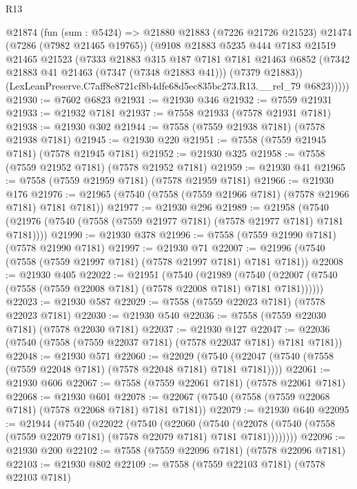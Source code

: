 \begin{lexlean}{R13}
\begin{coremodule}
      @21874
        (fun (sum : @5424) =>
        @21880
          @21883
          (@7226 @21726 @21523)
          @21474
          (@7286 (@7982 @21465 @19765))
          (@9108
            @21883
            @5235
            @444
            @7183
            @21519
            @21465
            @21523
            (@7333
              @21883
              @315
              @187
              @7181
              @7181
              @21463
              @6852
              (@7342 @21883 @41 @21463 (@7347 (@7348 @21883 @41)))
              (@7379 @21883))
            (LexLeanPreserve.C7aff8e8721cf8b4dfe68d5ec835bc273.R13.__rel_79 @6823)))))
@21930 := @7602 @6823
@21931 := @21930 @346
@21932 := @7559 @21931
@21933 := @21932 @7181
@21937 := @7558 @21933 (@7578 @21931 @7181)
@21938 := @21930 @302
@21944 := @7558 (@7559 @21938 @7181) (@7578 @21938 @7181)
@21945 := @21930 @220
@21951 := @7558 (@7559 @21945 @7181) (@7578 @21945 @7181)
@21952 := @21930 @325
@21958 := @7558 (@7559 @21952 @7181) (@7578 @21952 @7181)
@21959 := @21930 @41
@21965 := @7558 (@7559 @21959 @7181) (@7578 @21959 @7181)
@21966 := @21930 @176
@21976 := @21965 (@7540 (@7558 (@7559 @21966 @7181) (@7578 @21966 @7181) @7181 @7181))
@21977 := @21930 @296
@21989 := @21958
    (@7540 (@21976 (@7540 (@7558 (@7559 @21977 @7181) (@7578 @21977 @7181) @7181 @7181))))
@21990 := @21930 @378
@21996 := @7558 (@7559 @21990 @7181) (@7578 @21990 @7181)
@21997 := @21930 @71
@22007 := @21996 (@7540 (@7558 (@7559 @21997 @7181) (@7578 @21997 @7181) @7181 @7181))
@22008 := @21930 @405
@22022 := @21951
    (@7540
      (@21989
        (@7540 (@22007 (@7540 (@7558 (@7559 @22008 @7181) (@7578 @22008 @7181) @7181 @7181))))))
@22023 := @21930 @587
@22029 := @7558 (@7559 @22023 @7181) (@7578 @22023 @7181)
@22030 := @21930 @540
@22036 := @7558 (@7559 @22030 @7181) (@7578 @22030 @7181)
@22037 := @21930 @127
@22047 := @22036 (@7540 (@7558 (@7559 @22037 @7181) (@7578 @22037 @7181) @7181 @7181))
@22048 := @21930 @571
@22060 := @22029
    (@7540 (@22047 (@7540 (@7558 (@7559 @22048 @7181) (@7578 @22048 @7181) @7181 @7181))))
@22061 := @21930 @606
@22067 := @7558 (@7559 @22061 @7181) (@7578 @22061 @7181)
@22068 := @21930 @601
@22078 := @22067 (@7540 (@7558 (@7559 @22068 @7181) (@7578 @22068 @7181) @7181 @7181))
@22079 := @21930 @640
@22095 := @21944
    (@7540
      (@22022
        (@7540
          (@22060
            (@7540
              (@22078 (@7540 (@7558 (@7559 @22079 @7181) (@7578 @22079 @7181) @7181 @7181))))))))
@22096 := @21930 @200
@22102 := @7558 (@7559 @22096 @7181) (@7578 @22096 @7181)
@22103 := @21930 @802
@22109 := @7558 (@7559 @22103 @7181) (@7578 @22103 @7181)

\end{coremodule}
\end{lexlean}
